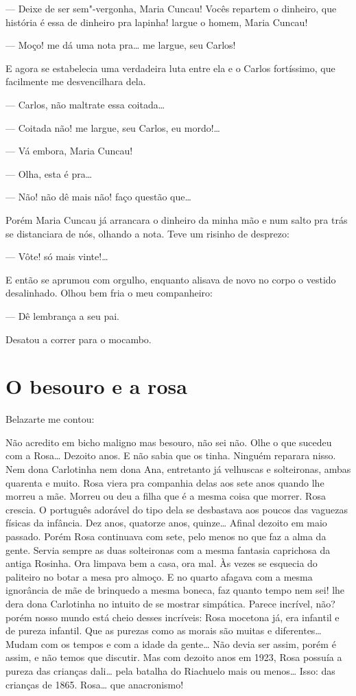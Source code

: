 --- Deixe de ser sem"-vergonha, Maria Cuncau! Vocês repartem o dinheiro,
que história é essa de dinheiro pra lapinha! largue o homem, Maria
Cuncau!

--- Moço! me dá uma nota pra\ldots{} me largue, seu Carlos!

E agora se estabelecia uma verdadeira luta entre ela e o Carlos
fortíssimo, que facilmente me desvencilhara dela.

--- Carlos, não maltrate essa coitada\ldots{}

--- Coitada não! me largue, seu Carlos, eu mordo!\ldots{}

--- Vá embora, Maria Cuncau!

--- Olha, esta é pra\ldots{}

--- Não! não dê mais não! faço questão que\ldots{}

Porém Maria Cuncau já arrancara o dinheiro da minha mão e num salto pra
trás se distanciara de nós, olhando a nota. Teve um risinho de desprezo:

--- Vôte! só mais vinte!\ldots{}

E então se aprumou com orgulho, enquanto alisava de novo no corpo o
vestido desalinhado. Olhou bem fria o meu companheiro:

--- Dê lembrança a seu pai.

Desatou a correr para o mocambo.

\chapter{O besouro e a rosa}


Belazarte me contou:

Não acredito em bicho maligno mas besouro, não sei não. Olhe o que
sucedeu com a Rosa\ldots{} Dezoito anos. E não sabia que os tinha. Ninguém
reparara nisso. Nem dona Carlotinha nem dona Ana, entretanto já
velhuscas e solteironas, ambas quarenta e muito. Rosa viera pra
companhia delas aos sete anos quando lhe morreu a mãe. Morreu ou deu a
filha que é a mesma coisa que morrer. Rosa crescia. O português adorável
do tipo dela se desbastava aos poucos das vaguezas físicas da infância.
Dez anos, quatorze anos, quinze\ldots{} Afinal dezoito em maio passado. Porém
Rosa continuava com sete, pelo menos no que faz a alma da gente. Servia
sempre as duas solteironas com a mesma fantasia caprichosa da antiga
Rosinha. Ora limpava bem a casa, ora mal. Às vezes se esquecia do
paliteiro no botar a mesa pro almoço. E no quarto afagava com a mesma
ignorância de mãe de brinquedo a mesma boneca, faz quanto tempo nem sei!
lhe dera dona Carlotinha no intuito de se mostrar simpática. Parece
incrível, não? porém nosso mundo está cheio desses incríveis: Rosa
mocetona já, era infantil e de pureza infantil. Que as purezas como as
morais são muitas e diferentes\ldots{} Mudam com os tempos e com a idade da
gente\ldots{} Não devia ser assim, porém é assim, e não temos que discutir.
Mas com dezoito anos em 1923, Rosa possuía a pureza das crianças dali\ldots{}
pela batalha do Riachuelo mais ou menos\ldots{} Isso: das crianças de 1865.
Rosa\ldots{} que anacronismo!

